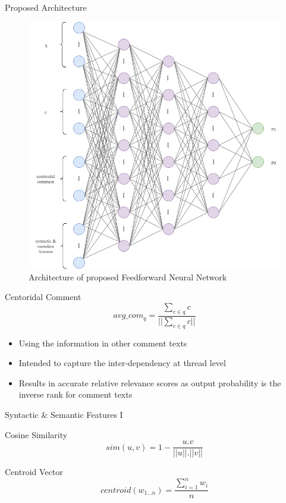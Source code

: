 \documentclass[10pt]{beamer}
\begin{document}
\begin{frame}{Proposed Architecture}
	\begin{figure}[t!]
	  \centering
	  \includegraphics[keepaspectratio, scale=0.275]{./Pictures/ann-arch.png}
	  \caption{Architecture of proposed Feedforward Neural Network}
	  \label{fig:ann-arch}
	\end{figure}
\end{frame}

\begin{frame}{Centoridal Comment}
\[ avg\_com_q = \frac{\sum\limits_{c \in q} c}{||\sum\limits_{c \in q} c||} \tag{1} \label{equation:1} \]

\begin{itemize}
\item Using the information in other comment texts
\item Intended to capture the inter-dependency at thread level
\item Results in accurate relative relevance scores as output probability is the inverse rank for comment texts
\end{itemize}
\end{frame}

\begin{frame}{Syntactic \& Semantic Features I}

Cosine Similarity
\[ sim(u, v) = 1 - \frac{u.v}{||u||.||v||} \tag{2} \label{equation:2} \]

Centroid Vector
\[ centroid(w_{1...n}) = \frac{\sum\limits_{i=1}^{n} w_i}{n} \tag{3} \label{equation:3} \]

\end{frame}
\end{document}
